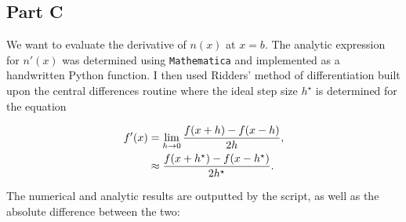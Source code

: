 \subsection{Part C}

We want to evaluate the derivative of $n(x)$ at $x = b$. The analytic expression for $n'(x)$ was determined using \texttt{Mathematica} and implemented as a handwritten Python function. I then used Ridders' method of differentiation built upon the central differences routine where the ideal step size $h^{\star}$ is determined for the equation

\begin{align}
f'(x) &= \lim_{h\to 0} {f(x+h)-f(x-h) \over 2h}, \\
&\approx {f(x+h^{\star})-f(x-h^{\star}) \over 2h^{\star}}.
\end{align}



The numerical and analytic results are outputted by the script, as well as the absolute difference between the two:


